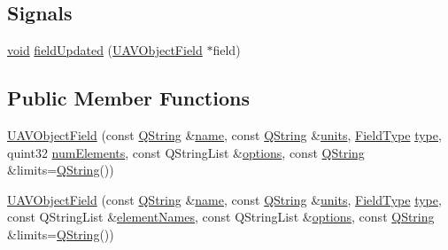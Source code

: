 \subsection*{Signals}
\begin{DoxyCompactItemize}
\item 
\hyperlink{group___u_a_v_objects_plugin_ga444cf2ff3f0ecbe028adce838d373f5c}{void} \hyperlink{group___u_a_v_objects_plugin_ga03a1f1534e4c805d091fc17e9ab5ad14}{field\-Updated} (\hyperlink{class_u_a_v_object_field}{U\-A\-V\-Object\-Field} $\ast$field)
\end{DoxyCompactItemize}
\subsection*{Public Member Functions}
\begin{DoxyCompactItemize}
\item 
\hyperlink{group___u_a_v_objects_plugin_ga6ebca8c11d33d2984ef111420988e11d}{U\-A\-V\-Object\-Field} (const \hyperlink{group___u_a_v_objects_plugin_gab9d252f49c333c94a72f97ce3105a32d}{Q\-String} \&\hyperlink{glext_8h_ad977737dfc9a274a62741b9500c49a32}{name}, const \hyperlink{group___u_a_v_objects_plugin_gab9d252f49c333c94a72f97ce3105a32d}{Q\-String} \&\hyperlink{group___u_a_v_objects_plugin_ga1ecf5fdaab2ac408b67623d5d75368c5}{units}, \hyperlink{group___u_a_v_objects_plugin_ga74498368bc91f3ed74beacb096744cf3}{Field\-Type} \hyperlink{glext_8h_a7d05960f4f1c1b11f3177dc963a45d86}{type}, quint32 \hyperlink{group___u_a_v_objects_plugin_gaa82f6e1f5deca501c58b45d902be0ef4}{num\-Elements}, const Q\-String\-List \&\hyperlink{group___u_a_v_objects_plugin_ga97fe1c3ed2d74eb06ea7e24abf4ce09c}{options}, const \hyperlink{group___u_a_v_objects_plugin_gab9d252f49c333c94a72f97ce3105a32d}{Q\-String} \&limits=\hyperlink{group___u_a_v_objects_plugin_gab9d252f49c333c94a72f97ce3105a32d}{Q\-String}())
\item 
\hyperlink{group___u_a_v_objects_plugin_ga9e178e25087b21a817679f18f3be1fa0}{U\-A\-V\-Object\-Field} (const \hyperlink{group___u_a_v_objects_plugin_gab9d252f49c333c94a72f97ce3105a32d}{Q\-String} \&\hyperlink{glext_8h_ad977737dfc9a274a62741b9500c49a32}{name}, const \hyperlink{group___u_a_v_objects_plugin_gab9d252f49c333c94a72f97ce3105a32d}{Q\-String} \&\hyperlink{group___u_a_v_objects_plugin_ga1ecf5fdaab2ac408b67623d5d75368c5}{units}, \hyperlink{group___u_a_v_objects_plugin_ga74498368bc91f3ed74beacb096744cf3}{Field\-Type} \hyperlink{glext_8h_a7d05960f4f1c1b11f3177dc963a45d86}{type}, const Q\-String\-List \&\hyperlink{group___u_a_v_objects_plugin_ga5849334da3325c4cac8625bb5910d57d}{element\-Names}, const Q\-String\-List \&\hyperlink{group___u_a_v_objects_plugin_ga97fe1c3ed2d74eb06ea7e24abf4ce09c}{options}, const \hyperlink{group___u_a_v_objects_plugin_gab9d252f49c333c94a72f97ce3105a32d}{Q\-String} \&limits=\hyperlink{group___u_a_v_objects_plugin_gab9d252f49c333c94a72f97ce3105a32d}{Q\-String}())

\end{DoxyCompactItemize}
